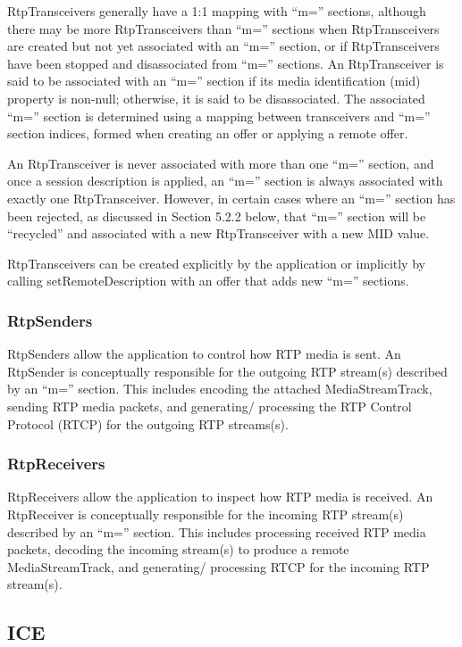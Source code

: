 \documentclass{article}
\begin{document}
RtpTransceivers generally have a 1:1 mapping with ``m='' sections,
although there may be more RtpTransceivers than ``m='' sections when
RtpTransceivers are created but not yet associated with an ``m=''
section, or if RtpTransceivers have been stopped and disassociated
from ``m='' sections.  An RtpTransceiver is said to be associated with
an ``m='' section if its media identification (mid) property is non-null;
otherwise, it is said to be disassociated.  The associated ``m=''
section is determined using a mapping between transceivers and ``m=''
section indices, formed when creating an offer or applying a remote
offer.

An RtpTransceiver is never associated with more than one ``m=''
section, and once a session description is applied, an ``m='' section
is always associated with exactly one RtpTransceiver.  However, in
certain cases where an ``m='' section has been rejected, as discussed
in Section 5.2.2 below, that ``m='' section will be ``recycled'' and
associated with a new RtpTransceiver with a new MID value.

RtpTransceivers can be created explicitly by the application or
implicitly by calling setRemoteDescription with an offer that adds
new ``m='' sections.

\subsubsection{RtpSenders}

RtpSenders allow the application to control how RTP media is sent.
An RtpSender is conceptually responsible for the outgoing RTP
stream(s) described by an ``m='' section.  This includes encoding the
attached MediaStreamTrack, sending RTP media packets, and generating/
processing the RTP Control Protocol (RTCP) for the outgoing RTP
streams(s).

\subsubsection{RtpReceivers}

RtpReceivers allow the application to inspect how RTP media is
received.  An RtpReceiver is conceptually responsible for the
incoming RTP stream(s) described by an ``m='' section.  This includes
processing received RTP media packets, decoding the incoming
stream(s) to produce a remote MediaStreamTrack, and generating/
processing RTCP for the incoming RTP stream(s).

\subsection{ICE}
\end{document}
